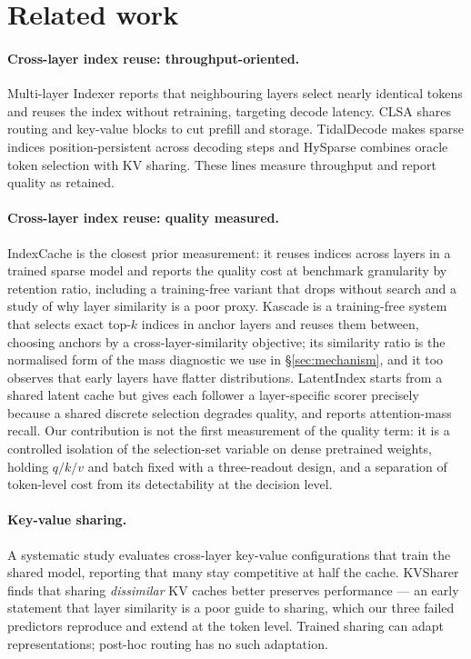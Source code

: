 \documentclass[10pt]{article}
\begin{document}
\section{Related work}

\paragraph{Cross-layer index reuse: throughput-oriented.} Multi-layer Indexer
\citep{mli} reports that neighbouring layers select nearly identical tokens
and reuses the index without retraining, targeting decode latency. CLSA
\citep{clsa} shares routing and key-value blocks to cut prefill and storage.
TidalDecode \citep{tidaldecode} makes sparse indices position-persistent across
decoding steps and HySparse \citep{hysparse} combines oracle token selection
with KV sharing. These lines measure throughput and report quality as retained.

\paragraph{Cross-layer index reuse: quality measured.} IndexCache
\citep{indexcache} is the closest prior measurement: it reuses indices across
layers in a trained sparse model and reports the quality cost at benchmark
granularity by retention ratio, including a training-free variant that drops
without search and a study of why layer similarity is a poor proxy. Kascade
\citep{kascade} is a training-free system that selects exact top-$k$ indices
in anchor layers and reuses them between, choosing anchors by a
cross-layer-similarity objective; its similarity ratio is the normalised form
of the mass diagnostic we use in \S\ref{sec:mechanism}, and it too observes
that early layers have flatter distributions. LatentIndex \citep{latentindex}
starts from a shared latent cache but gives each follower a layer-specific
scorer precisely because a shared discrete selection degrades quality, and
reports attention-mass recall. Our contribution is not the first measurement
of the quality term: it is a controlled isolation of the selection-set
variable on dense pretrained weights, holding $q/k/v$ and batch fixed with a
three-readout design, and a separation of token-level cost from its
detectability at the decision level.

\paragraph{Key-value sharing.} A systematic study \citep{kvshare} evaluates
cross-layer key-value configurations that train the shared model, reporting
that many stay competitive at half the cache. KVSharer \citep{kvsharer} finds
that sharing \emph{dissimilar} KV caches better preserves performance — an
early statement that layer similarity is a poor guide to sharing, which our
three failed predictors reproduce and extend at the token level. Trained
sharing can adapt representations; post-hoc routing has no such adaptation.
\end{document}
